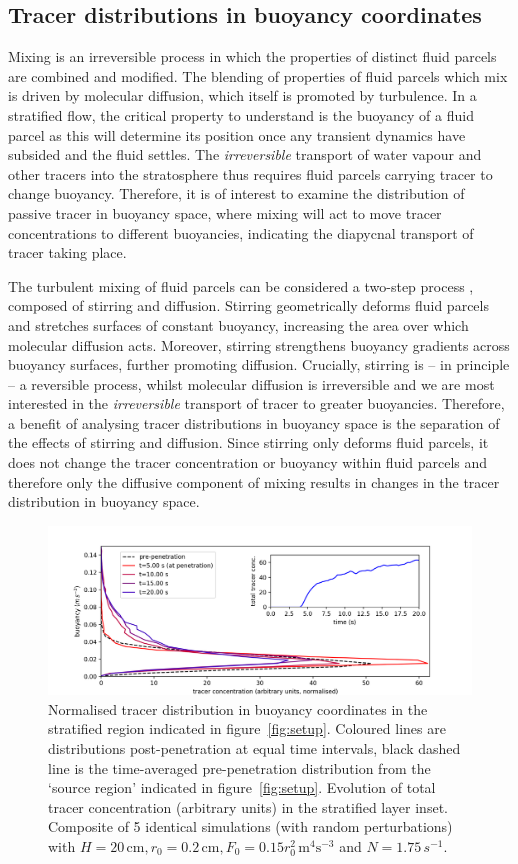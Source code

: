 \documentclass[a4paper]{article}
\begin{document}
\subsection{Tracer distributions in buoyancy coordinates}
\label{sec:distributions}

Mixing is an irreversible process in which the properties of distinct fluid parcels are combined and modified.
The blending of properties of fluid parcels which mix is driven by molecular diffusion, which itself
is promoted by turbulence. In a stratified flow, the critical property to understand is the buoyancy of a
fluid parcel as this will determine its position once any transient dynamics have subsided and the fluid
settles. The \emph{irreversible} transport of water vapour and other tracers into the stratosphere thus
requires fluid parcels carrying tracer to change buoyancy. Therefore, it is of interest to examine the
distribution of passive tracer in buoyancy space, where mixing will act to move tracer concentrations to
different buoyancies, indicating the diapycnal transport of tracer taking place. 

The turbulent mixing of fluid parcels can be considered a two-step process \citep{wykes2014}, composed of
stirring and diffusion. Stirring geometrically deforms fluid parcels and stretches surfaces of
constant buoyancy, increasing the area over which molecular diffusion acts. Moreover, stirring strengthens
buoyancy gradients across buoyancy surfaces, further promoting diffusion. Crucially, stirring is -- in
principle -- a reversible process, whilst molecular diffusion is irreversible and we are most interested in
the \emph{irreversible} transport of tracer to greater buoyancies.  Therefore, a benefit of analysing tracer
distributions in buoyancy space is the separation of the effects of stirring and diffusion. Since stirring
only deforms fluid parcels, it does not change the tracer concentration or buoyancy within fluid parcels and
therefore only the diffusive component of mixing results in changes in the tracer distribution in buoyancy
space. 
\begin{figure}
	\centering
	\includegraphics[width=.8\textwidth]{tb_dist}
	\caption{Normalised tracer distribution in buoyancy coordinates in the stratified region indicated in
		figure~\ref{fig:setup}. Coloured lines are distributions post-penetration at equal time intervals,
		black dashed line is the time-averaged pre-penetration distribution from the `source region' indicated
		in figure~\ref{fig:setup}. Evolution of total tracer concentration (arbitrary units) in the stratified
		layer inset. Composite of 5 identical simulations (with random perturbations) with $H =
		20\,\mathrm{cm}, r_0 = 0.2 \, \mathrm{cm}, F_0 = 0.15r_0^2 \, \mathrm{m}^4 \mathrm{s}^{-3}$ and $N =
		1.75 \,s^{-1}$.}
	\label{fig:tbdist}
\end{figure}
\end{document}

